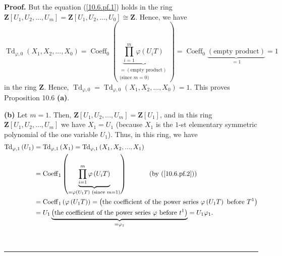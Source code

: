 \documentclass[numbers=enddot,12pt,final,onecolumn,notitlepage]{scrartcl}%
\newenvironment{proof}[1][Proof]{\noindent\textbf{#1.} }{\ \rule{0.5em}{0.5em}}
\begin{document}
\begin{proof}
But the equation (\ref{10.6.pf.1}) holds in the ring $\mathbf{Z}\left[
U_{1},U_{2},...,U_{m}\right]  =\mathbf{Z}\left[  U_{1},U_{2},...,U_{0}\right]
\cong\mathbf{Z}$. Hence, we have%
\[
\operatorname*{Td}\nolimits_{\varphi,0}\left(  X_{1},X_{2},...,X_{0}\right)
=\operatorname*{Coeff}\nolimits_{0}\left(  \underbrace{\prod\limits_{i=1}%
^{m}\varphi\left(  U_{i}T\right)  }_{\substack{=\left(  \text{empty
product}\right)  \\\text{(since }m=0\text{)}}}\right)  =\operatorname*{Coeff}%
\nolimits_{0}\underbrace{\left(  \text{empty product}\right)  }_{=1}=1
\]
in the ring $\mathbf{Z}$. Hence, $\operatorname*{Td}\nolimits_{\varphi
,0}=\operatorname*{Td}\nolimits_{\varphi,0}\left(  X_{1},X_{2},...,X_{0}%
\right)  =1$. This proves Proposition 10.6 \textbf{(a)}.

\textbf{(b)} Let $m=1$. Then, $\mathbf{Z}\left[  U_{1},U_{2},...,U_{m}\right]
=\mathbf{Z}\left[  U_{1}\right]  $, and in this ring $\mathbf{Z}\left[
U_{1},U_{2},...,U_{m}\right]  $ we have $X_{1}=U_{1}$ (because $X_{1}$ is the
$1$-st elementary symmetric polynomial of the one variable $U_{1}$). Thus, in
this ring, we have%
\begin{align*}
\operatorname*{Td}\nolimits_{\varphi,1}\left(  U_{1}\right)   &
=\operatorname*{Td}\nolimits_{\varphi,1}\left(  X_{1}\right)
=\operatorname*{Td}\nolimits_{\varphi,1}\left(  X_{1},X_{2},...,X_{1}\right)
\\
&  =\operatorname*{Coeff}\nolimits_{1}\left(  \underbrace{\prod\limits_{i=1}%
^{m}\varphi\left(  U_{i}T\right)  }_{=\varphi\left(  U_{1}T\right)  \text{
(since }m=1\text{)}}\right)  \ \ \ \ \ \ \ \ \ \ \left(  \text{by
(\ref{10.6.pf.2})}\right) \\
&  =\operatorname*{Coeff}\nolimits_{1}\left(  \varphi\left(  U_{1}T\right)
\right)  =\left(  \text{the coefficient of the power series }\varphi\left(
U_{1}T\right)  \text{ before }T^{1}\right) \\
&  =U_{1}\underbrace{\left(  \text{the coefficient of the power series
}\varphi\text{ before }t^{1}\right)  }_{=\varphi_{1}}=U_{1}\varphi_{1}.
\end{align*}



\end{proof}
\end{document}
